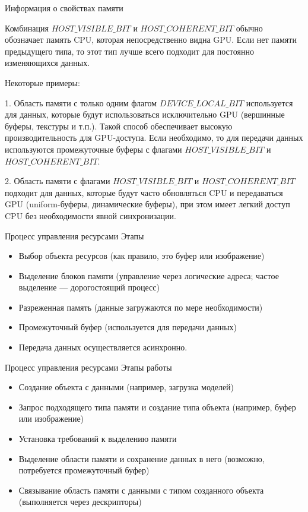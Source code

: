 \documentclass{beamer}
\begin{document}
\begin{frame}{Информация о свойствах памяти}
{	Комбинация $HOST\_VISIBLE\_BIT$  и $HOST\_COHERENT\_BIT$ обычно обозначает память CPU, которая непосредственно видна GPU. Если нет памяти предыдущего типа, то этот тип лучше всего подходит для постоянно изменяющихся данных.
	\fi
	
	Некоторые примеры:
	
	1. Область памяти с только одним флагом $DEVICE\_LOCAL\_BIT$ используется для данных, которые будут использоваться исключительно GPU (вершинные буферы, текстуры и т.п.). Такой способ обеспечивает высокую производительность для GPU-доступа.
	Если необходимо, то для передачи данных используются промежуточные буферы с флагами $HOST\_VISIBLE\_BIT$  и $HOST\_COHERENT\_BIT$.

	2. Область памяти с флагами $HOST\_VISIBLE\_BIT$ и $HOST\_COHERENT\_BIT$ подходит для данных, которые будут часто обновляться CPU и передаваться GPU (uniform-буферы, динамические буферы), при этом имеет легкий доступ CPU без необходимости явной синхронизации.
	
	}
		
	\end{frame}

	\begin{frame}{Процесс управления ресурсами}
		Этапы 
		\begin{itemize}
			\item 
			Выбор объекта ресурсов (как правило, это буфер или изображение)
			\item
			Выделение блоков памяти (управление через логические адреса; частое выделение --- дорогостоящий процесс)
			\item 
			Разреженная память (данные загружаются по мере необходимости)
			\item 
			Промежуточный буфер (используется для передачи данных)
			\item 
			Передача данных осуществляется асинхронно.
			
		\end{itemize}
\note{
	}
	\end{frame}
	\fi

	\begin{frame}{Процесс управления ресурсами}
		Этапы работы
		\begin{itemize}
			\item 
			Создание объекта с данными
			(например, загрузка моделей)
			\item
			Запрос подходящего типа памяти и создание типа объекта 
			(например, буфер или изображение) 
			\item 
			Установка требований к выделению памяти
			\item 
			Выделение области памяти и сохранение данных в него
			(возможно, потребуется промежуточный буфер)
			\item 
			Связывание область памяти с данными с типом созданного объекта
			(выполняется через дескрипторы)
		\end{itemize}
	\end{frame}
\end{document}
